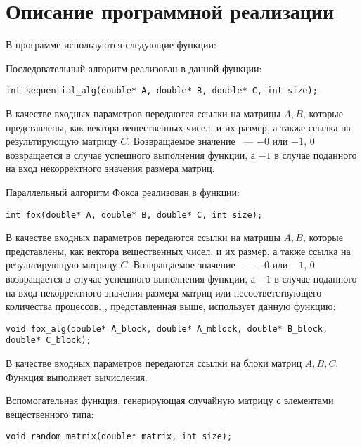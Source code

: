 \documentclass{report}
\begin{document}
\newpage

\section*{Описание программной реализации}
В программе используются следующие функции:
\par Последовательный алгоритм реализован в данной функции:
\begin{lstlisting}
int sequential_alg(double* A, double* B, double* C, int size);
\end{lstlisting}
\par В качестве входных параметров передаются ссылки на матрицы {\itshape $A, B$}, которые представлены, как вектора вещественных чисел, и их размер, а также ссылка на результирующую матрицу {\itshape $C$}. Возвращаемое значение ~--- {\itshape$-0$} или {\itshape$-1$}, {\itshape$0$} возвращается в случае успешного выполнения функции, а {\itshape$-1$} в случае поданного на вход некорректного значения размера матриц.
\par Параллельный алгоритм Фокса реализован в функции:
\begin{lstlisting}
int fox(double* A, double* B, double* C, int size);
\end{lstlisting}
\par В качестве входных параметров передаются ссылки на матрицы {\itshape $A, B$}, которые представлены, как вектора вещественных чисел, и их размер, а также ссылка на результирующую матрицу {\itshape $C$}. Возвращаемое значение ~--- {\itshape$-0$} или {\itshape$-1$}, {\itshape$0$} возвращается в случае успешного выполнения функции, а {\itshape$-1$} в случае поданного на вход некорректного значения размера матриц или несоответствующего количества процессов.
, представленная выше, использует данную функцию:
\begin{lstlisting}
void fox_alg(double* A_block, double* A_mblock, double* B_block, double* C_block);
\end{lstlisting}
\par В качестве входных параметров передаются ссылки на блоки матриц {\itshape $A, B, C$}. Функция выполняет вычисления.
\par Вспомогательная функция, генерирующая случайную матрицу с элементами вещественного типа:
\begin{lstlisting}
void random_matrix(double* matrix, int size);
\end{lstlisting}
\newpage
\end{document}
